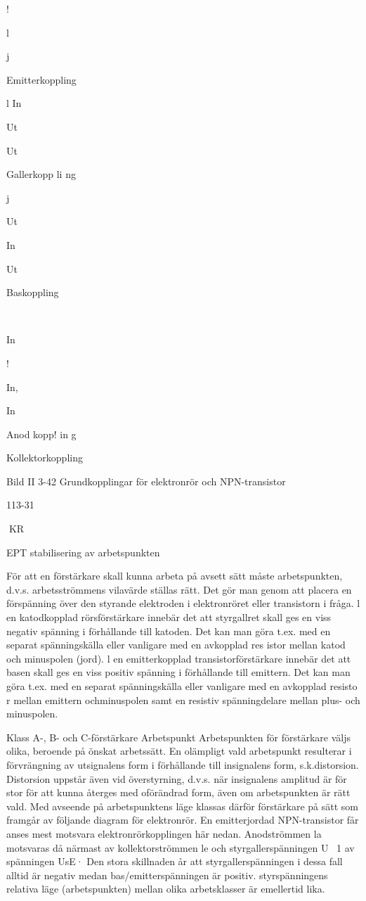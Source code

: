 \documentclass[a4paper,twoside,twocolumn,openright]{book}
\begin{document}
{{{{{{{!

l

j

Emitterkoppling

l
In

Ut

Ut

Gallerkopp li ng

j

Ut

In

Ut

Baskoppling

~

In

!

In,

In

Anod kopp! in g

Kollektorkoppling

Bild II 3-42 Grundkopplingar för elektronrör och NPN-transistor

113-31

KR

EPT
stabilisering av arbetspunkten

För att en förstärkare skall kunna arbeta på
avsett sätt måste arbetspunkten, d.v.s.
arbetsströmmens vilavärde ställas rätt.
Det gör man genom att placera en förspänning över den styrande elektroden i
elektronröret eller transistorn i fråga.
l en katodkopplad rörsförstärkare innebär det att styrgallret skall ges en viss negativ spänning i förhållande till katoden. Det
kan man göra t.ex. med en separat spänningskälla eller vanligare med en avkopplad
res istor mellan katod och minuspolen (jord).
l en emitterkopplad transistorförstärkare
innebär det att basen skall ges en viss positiv
spänning i förhållande till emittern. Det kan
man göra t.ex. med en separat spänningskälla eller vanligare med en avkopplad resisto r mellan emittern ochminuspolen samt en
resistiv spänningdelare mellan plus- och
minuspolen.

Klass A-, B- och C-förstärkare
Arbetspunkt
Arbetspunkten för förstärkare väljs olika,
beroende på önskat arbetssätt. En olämpligt
vald arbetspunkt resulterar i förvrängning av
utsignalens form i förhållande till insignalens
form, s.k.distorsion. Distorsion uppstår även
vid överstyrning, d.v.s. när insignalens amplitud är för stor för att kunna återges med
oförändrad form, även om arbetspunkten är
rätt vald.
Med avseende på arbetspunktens läge
klassas därför förstärkare på sätt som framgår av följande diagram för elektronrör. En
emitterjordad NPN-transistor får anses mest
motsvara elektronrörkopplingen här nedan.
Anodströmmen la motsvaras då närmast av
kollektorströmmen le och styrgallerspänningen U~ 1 av spänningen UsE· Den stora skillnaden år att styrgallerspänningen i dessa fall
alltid är negativ medan bas/emitterspänningen är positiv. styrspänningens relativa läge
(arbetspunkten) mellan olika arbetsklasser
är emellertid lika.

}}}}}}}
\end{document}

